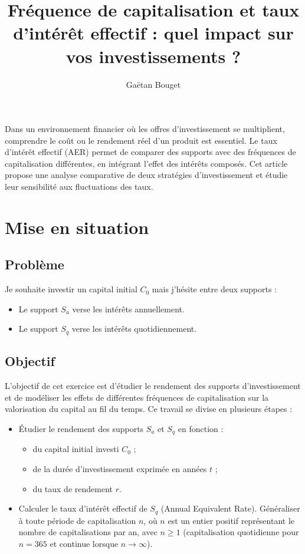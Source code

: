 \documentclass{article}
\title{Fréquence de capitalisation et taux d'intérêt effectif : quel impact sur vos investissements ?}
\author{Gaëtan Bouget}
\begin{document}
\maketitle

Dans un environnement financier où les offres d’investissement se multiplient, comprendre le coût ou le rendement réel d’un produit est essentiel. Le taux d’intérêt effectif (AER) permet de comparer des supports avec des fréquences de capitalisation différentes, en intégrant l’effet des intérêts composés. Cet article propose une analyse comparative de deux stratégies d’investissement et étudie leur sensibilité aux fluctuations des taux.

\section{Mise en situation}
\subsection{Problème}
Je souhaite investir un capital initial $C_0$ mais j'hésite entre deux supports :
\begin{itemize}
\item Le support $S_a$ verse les intérêts annuellement.
\item Le support $S_q$  verse les intérêts quotidiennement.
\end{itemize}

\subsection{Objectif}
L'objectif de cet exercice est d'étudier le rendement des supports d'investissement et de modéliser les effets de différentes fréquences de capitalisation sur la valorisation du capital au fil du temps. Ce travail se divise en plusieurs étapes :

\begin{itemize}
    \item Étudier le rendement des supports $S_a$ et $S_q$ en fonction :
    \begin{itemize}
        \item du capital initial investi $C_0$ ;
        \item de la durée d'investissement exprimée en années $t$ ;
        \item du taux de rendement $r$.
    \end{itemize}
    \item Calculer le taux d'intérêt effectif de $S_q$ (Annual Equivalent Rate). Généraliser à toute période de capitalisation $n$, où $n$ est un entier positif représentant le nombre de capitalisations par an, avec $n \geq 1$ (capitalisation quotidienne pour $n = 365$ et continue lorsque $n \to \infty$).
\end{itemize}
\end{document}
